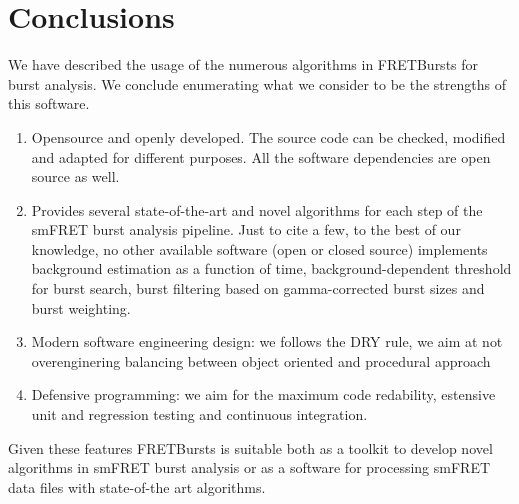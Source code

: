 \section{Conclusions}

We have described the usage of the numerous algorithms in FRETBursts
for burst analysis. We conclude enumerating what we consider to be the strengths
of this software.

\begin{enumerate}
\item Opensource and openly developed. The source code can be checked, modified and
adapted for different purposes. All the software dependencies are open source as well.
\item Provides several state-of-the-art and novel algorithms for each step of the 
smFRET burst analysis pipeline. Just to cite a few, to the best of our knowledge, no other available software
(open or closed source) implements background estimation as a function of time,
background-dependent threshold for burst search, burst filtering based on 
gamma-corrected burst sizes and burst weighting.
\item Modern software engineering design: we follows the DRY rule, we aim at not
overenginering balancing between object oriented and procedural approach
\item Defensive programming: we aim for the maximum code redability,
estensive unit and regression testing and continuous integration.
\end{enumerate}

Given these features FRETBursts is suitable both as a toolkit to develop novel algorithms
in smFRET burst analysis or as a software for processing smFRET data files with
state-of-the art algorithms.
